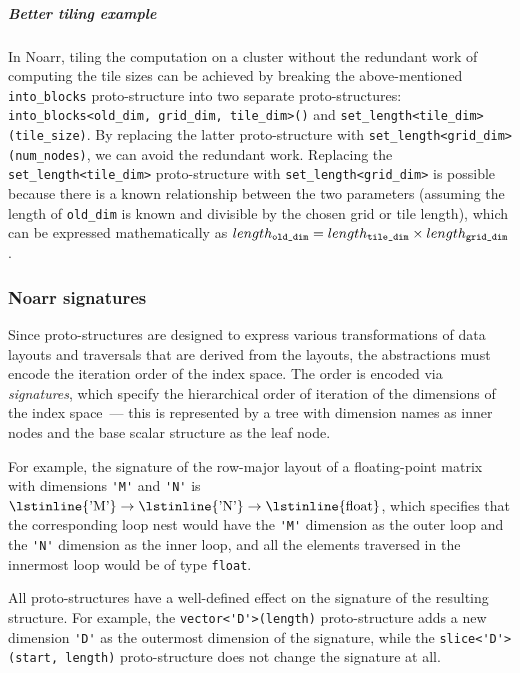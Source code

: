 \subparagraph*{Better tiling example}
In Noarr, tiling the computation on a cluster without the redundant work of computing the tile sizes can be achieved by breaking the above-mentioned \lstinline{into_blocks} proto-structure into two separate proto-structures: \lstinline{into_blocks<old_dim, grid_dim, tile_dim>()} and \lstinline{set_length<tile_dim>(tile_size)}. By replacing the latter proto-structure with \lstinline{set_length<grid_dim>(num_nodes)}, we can avoid the redundant work.
Replacing the \lstinline{set_length<tile_dim>} proto-structure with \lstinline{set_length<grid_dim>} is possible because there is a known relationship between the two parameters (assuming the length of \lstinline{old_dim} is known and divisible by the chosen grid or tile length), which can be expressed mathematically as $length_{\text{\texttt{old\_dim}}} = length_{\text{\texttt{tile\_dim}}} \times length_{\text{\texttt{grid\_dim}}}$.

\subsubsection{Noarr signatures}\label{sec:noarr-signatures}

Since proto-structures are designed to express various transformations of data layouts and traversals that are derived from the layouts, the abstractions must encode the iteration order of the index space. The order is encoded via \emph{signatures}, which specify the hierarchical order of iteration of the dimensions of the index space~--- this is represented by a tree with dimension names as inner nodes and the base scalar structure as the leaf node.

For example, the signature of the row-major layout of a floating-point matrix with dimensions \lstinline{'M'} and \lstinline{'N'} is $\text{\lstinline{'M'}} \to \text{\lstinline{'N'}} \to \text{\lstinline{float}}$, which specifies that the corresponding loop nest would have the \lstinline{'M'} dimension as the outer loop and the \lstinline{'N'} dimension as the inner loop, and all the elements traversed in the innermost loop would be of type \lstinline{float}.

All proto-structures have a well-defined effect on the signature of the resulting structure. For example, the \lstinline{vector<'D'>(length)} proto-structure adds a new dimension \lstinline{'D'} as the outermost dimension of the signature, while the \lstinline{slice<'D'>(start, length)} proto-structure does not change the signature at all.


